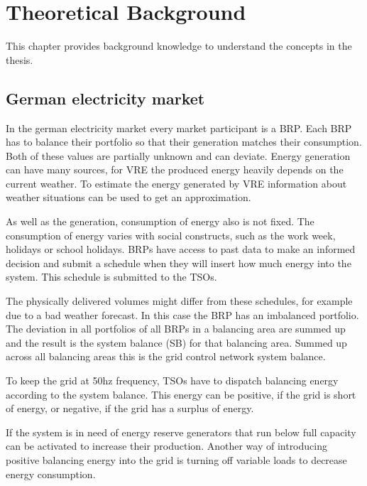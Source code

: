 \documentclass[class=scrbook, crop=false]{standalone}
\begin{document}
\ifstandalone

    
\fi

\chapter{Theoretical Background}
\label{Chapter::Theoretical_Background} %
This chapter provides background knowledge to understand the concepts in the thesis.

\section{German electricity market}
\label{Section::German_Electricity_Market}

In the german electricity market every market participant is a BRP. Each BRP has to balance their portfolio so that their generation matches their consumption. Both of these values are partially unknown and can deviate. 
Energy generation can have many sources, for VRE the produced energy heavily depends on the current weather.
To estimate the energy generated by VRE information about weather situations can be used to get an approximation. 

As well as the generation, consumption of energy also is not fixed. The consumption of energy varies with social constructs, such as the work week, holidays or school holidays. 
BRPs have access to past data to make an informed decision and submit a schedule when they will insert how much energy into the system.
This schedule is submitted to the TSOs.

The physically delivered volumes might differ from these schedules, for example due to a bad weather forecast. In this case the BRP has an imbalanced portfolio.
The deviation in all portfolios of all BRPs in a balancing area are summed up and the result is the system balance (SB) for that balancing area. Summed up across all balancing areas this is the grid control network system balance.

To keep the grid at 50hz frequency, TSOs have to dispatch balancing energy according to the system balance. This energy can be positive, if the grid is short of energy, or negative, if the grid has a surplus of energy. 

If the system is in need of energy reserve generators that run below full capacity can be activated to increase their production. Another way of introducing positive balancing energy into the grid is turning off variable loads to decrease energy consumption.
\end{document}
